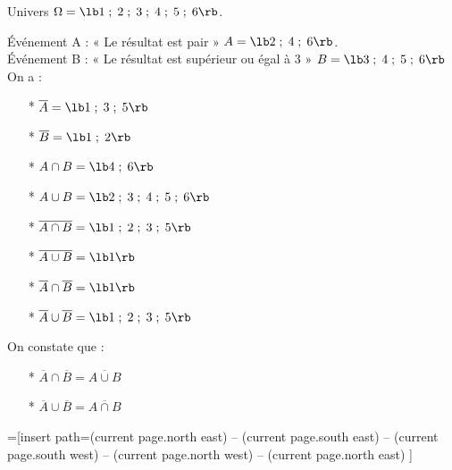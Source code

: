 Univers $\Omega = \lb 1\; ; \; 2 \; ; \; 3 \; ; \; 4 \; ; \; 5 \; ; \; 6 \rb $.

Événement A : « Le résultat est pair » $ A = \lb 2 \; ; \; 4 \; ; \; 6 \rb $. \\

Événement B : « Le résultat est supérieur ou égal à 3 » $ B = \lb 3\; ; \; 4 \; ; \; 5 \; ; \; 6 \rb $ \\

On a : 

\begin{itemize}
\item[*] $ \overline{A} = \lb 1\; ; \; 3 \; ; \; 5\rb $ \\
\item[*] $ \overline{B} = \lb 1 \; ; \; 2 \rb $ \\
\item[*] $ A \cap B = \lb 4 \; ; \; 6 \rb $ \\
\item[*] $ A \cup B = \lb 2 \; ; \; 3 \; ; \; 4 \; ; \; 5 \; ; \; 6 \rb $ \\
\item[*] $ \overline{A \cap B} = \lb 1 \; ; \; 2 \; ; \;  3 \; ; \; 5 \rb $ \\
\item[*] $\overline{A \cup B} = \lb 1 \rb $ \\
\item[*] $ \overline{A} \cap \overline{B} = \lb 1 \rb $ \\
\item[*] $ \overline{A} \cup \overline{B} = \lb 1 \; ; \; 2 \; ; \; 3 \; ; \; 5 \rb $ \\
\end{itemize}

On constate que : 

\begin{itemize}
\item[*] $ \overline{A} \cap \overline{B} = \overline{A \cup B} $ \\
\item[*] $ \overline{A} \cup \overline{B} = \overline{A \cap B} $ \\
\end{itemize}


=[insert path={(current page.north east) --
  (current page.south east) --
  (current page.south west) --
  (current page.north west) --
  (current page.north east)}
]

\def\A_rond{(0,-.5)  circle  (1 and 2.5)}
\def\B_rond{(1,1)  circle  (1 and 2)}
\def\GrandRond{(2:0) circle (3.5 and 4)}

